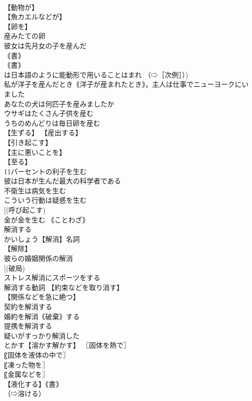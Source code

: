 \documentclass[8pt]{extreport}
\begin{document}
\begin{CJK}{UTF8}{min}
\\	【動物が】
\\	【魚カエルなどが】
\\	【卵を】
\\	産みたての卵 
\\	彼女は先月女の子を産んだ 
\\	｟書｠ 
\\	｟書｠ 
\\	は日本語のように能動形で用いることはまれ （⇨［次例］）) 
\\	私が洋子を産んだとき｟洋子が産まれたとき｠，主人は仕事でニューヨークにいました 
\\	あなたの犬は何匹子を産みましたか 
\\	ウサギはたくさん子供を産む 
\\	うちのめんどりは毎日卵を産む 
\\	【生ずる】 【産出する】
\\	【引き起こす】
\\	【主に悪いことを】
\\	【至る】
\\	11パーセントの利子を生む 
\\	彼は日本が生んだ最大の科学者である 
\\	不衛生は病気を生む 
\\	こういう行動は疑惑を生む 
\\	[(呼び起こす) 
\\	金が金を生む ｟ことわざ｠
\\	解消する		
\\	かいしょう【解消】名詞 
\\	【解除】
\\	彼らの婚姻関係の解消 
\\	[(破局) 
\\	ストレス解消にスポーツをする 
\\	解消する動詞 【約束などを取り消す】
\\	【関係などを急に絶つ】
\\	契約を解消する 
\\	婚約を解消｟破棄｠する 
\\	提携を解消する 
\\	疑いがすっかり解消した 
\\	とかす【溶かす解かす】 〖固体を熱で〗
\\	〖固体を液体の中で〗
\\	〖凍った物を〗
\\	〖金属などを〗
\\	【液化する】｟書｠
\\	（⇨溶ける） 

\end{CJK}
\end{document}
